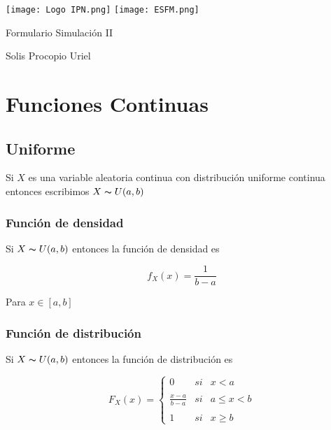 \documentclass{article}
\date{\today}
\begin{document}
\thispagestyle{empty}
	
	\texttt{[image: Logo IPN.png]}
	\texttt{[image: ESFM.png]}
	
\begin{center}
        	
\LARGE
	Formulario  Simulación II
	
        	
\vspace{0.5cm}
\normalsize	
Solis Procopio Uriel 

\vspace{0.5cm}
\end{center}

\setcounter{page}{1}
\pagestyle{plain}

    
    \section{Funciones Continuas}   

        \subsection{Uniforme}

            Si $X$ es una variable aleatoria continua con distribución uniforme continua entonces escribimos $X \thicksim U(a,b)$

            \subsubsection{Función de densidad}

                Si $X\thicksim U(a,b)$ entonces la función de densidad es

                    \begin{equation*}
                        f_X (x) = \frac{1}{b-a}
                    \end{equation*}

                Para $x\in [a,b]$

            \subsubsection{Función de distribución}

                Si $X\thicksim U(a,b)$ entonces la función de distribución es

                    \begin{equation*}
                        F_X (x)= \left\{ \begin{array}{lcc}
                                 0 &   si  & x < a \\
                                 \\ \frac{x-a}{b-a} &  si & a \leq  x < b \\
                                 \\ 1 &  si  & x \geq b
                                 \end{array}
                                \right.
                    \end{equation*}
                    
\end{document}
